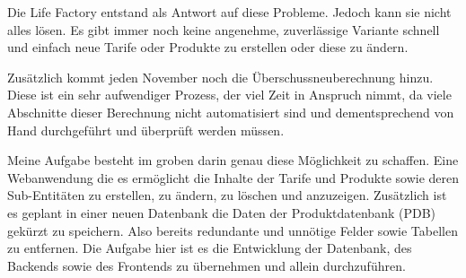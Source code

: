 Die Life Factory entstand als Antwort auf diese Probleme. Jedoch kann sie nicht alles lösen.
Es gibt immer noch keine angenehme, zuverlässige Variante schnell und einfach neue Tarife oder Produkte zu erstellen oder diese zu ändern.

Zusätzlich kommt jeden November noch die Überschussneuberechnung hinzu. Diese ist ein sehr aufwendiger Prozess, der viel Zeit in Anspruch nimmt,
da viele Abschnitte dieser Berechnung nicht automatisiert sind und dementsprechend von Hand durchgeführt und überprüft werden müssen.

Meine Aufgabe besteht im groben darin genau diese Möglichkeit zu schaffen. Eine Webanwendung die es ermöglicht die Inhalte der Tarife und Produkte sowie deren Sub-Entitäten
zu erstellen, zu ändern, zu löschen und anzuzeigen. Zusätzlich ist es geplant in einer neuen Datenbank die Daten der Produktdatenbank (PDB) gekürzt zu speichern.
Also bereits redundante und unnötige Felder sowie Tabellen zu entfernen. Die Aufgabe hier ist es die Entwicklung der Datenbank, des Backends sowie des Frontends zu übernehmen und allein durchzuführen.


